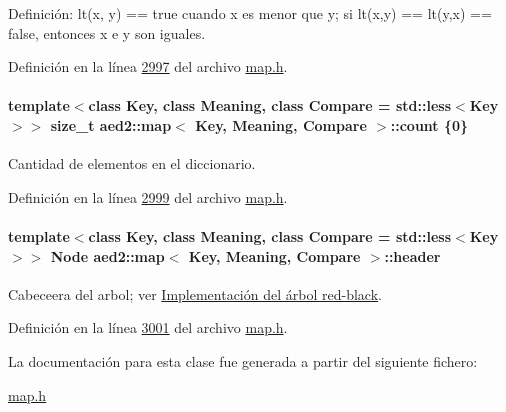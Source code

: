 Definición\-: lt(x, y) == true cuando x es menor que y; si lt(x,y) == lt(y,x) == false, entonces x e y son iguales. 

Definición en la línea \hyperlink{map_8h_source_l02997}{2997} del archivo \hyperlink{map_8h_source}{map.\-h}.

\hypertarget{classaed2_1_1map_a44236c4f16cdc20a10759862b198bde4_a44236c4f16cdc20a10759862b198bde4}{
\paragraph[{count}]{\setlength{\rightskip}{0pt plus 5cm}template$<$class Key, class Meaning, class Compare = std\-::less$<$\-Key$>$$>$ size\-\_\-t {\bf aed2\-::map}$<$ Key, Meaning, Compare $>$\-::count \{0\}\hspace{0.3cm}{\ttfamily [private]}}}\label{classaed2_1_1map_a44236c4f16cdc20a10759862b198bde4_a44236c4f16cdc20a10759862b198bde4}


Cantidad de elementos en el diccionario. 



Definición en la línea \hyperlink{map_8h_source_l02999}{2999} del archivo \hyperlink{map_8h_source}{map.\-h}.

\hypertarget{classaed2_1_1map_a92d93f905c8ad73fba18fdc7e8915cce_a92d93f905c8ad73fba18fdc7e8915cce}{
\paragraph[{header}]{\setlength{\rightskip}{0pt plus 5cm}template$<$class Key, class Meaning, class Compare = std\-::less$<$\-Key$>$$>$ {\bf Node} {\bf aed2\-::map}$<$ Key, Meaning, Compare $>$\-::header\hspace{0.3cm}{\ttfamily [private]}}}\label{classaed2_1_1map_a92d93f905c8ad73fba18fdc7e8915cce_a92d93f905c8ad73fba18fdc7e8915cce}


Cabeceera del arbol; ver \hyperlink{Implementacion}{Implementación del árbol red-\/black}. 



Definición en la línea \hyperlink{map_8h_source_l03001}{3001} del archivo \hyperlink{map_8h_source}{map.\-h}.



La documentación para esta clase fue generada a partir del siguiente fichero\-:\begin{DoxyCompactItemize}
\item 
\hyperlink{map_8h}{map.\-h}\end{DoxyCompactItemize}
